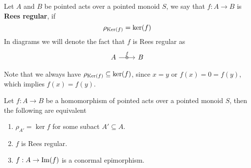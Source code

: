 \begin{definition}
    Let $A$ and $B$ be pointed acts over a pointed monoid $S$, we say that 
    $f: A\to B$ is \textbf{Rees regular}, if 
    \[
        \rho_{\mathrm{Ker}(f)} = \mathrm{ker}(f)
    \]
    In diagrams we will denote the fact that $f$ is Rees regular as 
    \[\begin{tikzcd}
	A & B
	\arrow["f", "\circ"{marking}, from=1-1, to=1-2]
\end{tikzcd}\]
\end{definition}
\begin{remark}
    Note that we always have $\rho_{\mathrm{Ker}(f)}\subseteq\mathrm{ker}(f)$, since $x=y$ or $f(x)=0=f(y)$, which implies $f(x)=f(y)$.
\end{remark}
\begin{proposition}\label{regChar}
    Let $f: A\to B$ be a homomorphism of pointed acts over a pointed monoid $S$, then the following are equivalent
    \begin{enumerate}
        \item $\rho_{A'} = \ker{f}$ for some subact $A'\subseteq A$.
        \item $f$ is Rees regular.
        \item $f: A \to\mathrm{Im}(f)$ is a conormal epimorphism.
    \end{enumerate}
\end{proposition}
